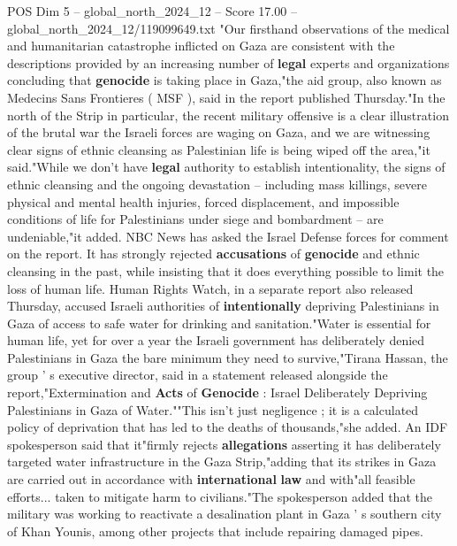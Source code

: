 \begin{textsample}{POS Dim 5 – global\_north\_2024\_12 – Score 17.00 – global\_north\_2024\_12/119099649.txt}  \label{ex:f5_pos_128}
"Our firsthand observations of the medical and humanitarian catastrophe inflicted on Gaza are consistent with the descriptions provided by an increasing number of \textbf{legal} experts and organizations concluding that \textbf{genocide} is taking place in Gaza,"the aid group, also known as Medecins Sans Frontieres ( MSF ), said in the report published Thursday."In the north of the Strip in particular, the recent military offensive is a clear illustration of the brutal war the Israeli forces are waging on Gaza, and we are witnessing clear signs of ethnic cleansing as Palestinian life is being wiped off the area,"it said."While we don't have \textbf{legal} authority to establish intentionality, the signs of ethnic cleansing and the ongoing devastation -- including mass killings, severe physical and mental health injuries, forced displacement, and impossible conditions of life for Palestinians under siege and bombardment -- are undeniable,"it added.
NBC News has asked the Israel Defense forces for comment on the report.
It has strongly rejected \textbf{accusations} of \textbf{genocide} and ethnic cleansing in the past, while insisting that it does everything possible to limit the loss of human life.
Human Rights Watch, in a separate report also released Thursday, accused Israeli authorities of \textbf{intentionally} depriving Palestinians in Gaza of access to safe water for drinking and sanitation."Water is essential for human life, yet for over a year the Israeli government has deliberately denied Palestinians in Gaza the bare minimum they need to survive,"Tirana Hassan, the group ' s executive director, said in a statement released alongside the report,"Extermination and \textbf{Acts} of \textbf{Genocide} : Israel Deliberately Depriving Palestinians in Gaza of Water.""This isn't just negligence ; it is a calculated policy of deprivation that has led to the deaths of thousands,"she added.
An IDF spokesperson said that it"firmly rejects \textbf{allegations} asserting it has deliberately targeted water infrastructure in the Gaza Strip,"adding that its strikes in Gaza are carried out in accordance with \textbf{international} \textbf{law} and with"all feasible efforts... taken to mitigate harm to civilians."The spokesperson added that the military was working to reactivate a desalination plant in Gaza ' s southern city of Khan Younis, among other projects that include repairing damaged pipes.

\end{textsample}
